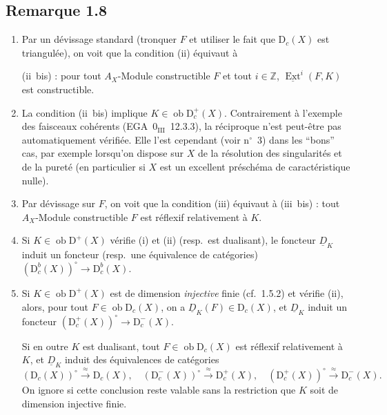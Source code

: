\documentclass[11pt]{article}
\DeclareMathOperator{\Ext}{Ext}
\newcommand{\D}{\mathrm{D}}
\newcommand{\Z}{\mathbb{Z}}
\newcommand{\ob}{\operatorname{ob}}
\begin{document}
\subsection*{Remarque 1.8}
\begin{enumerate}[label=\alph*)]
\item Par un dévissage standard (tronquer $F$ et utiliser le fait que $\D_c(X)$ est triangulée), on voit que la condition (ii) équivaut à

(ii~bis) : pour tout $A_X$-Module constructible $F$ et tout $i \in \Z$, $\underline{\Ext}^i(F,K)$ est constructible.

\item La condition (ii~bis) implique $K \in \ob \D_c^{+}(X)$. Contrairement à l'exemple des faisceaux cohérents (EGA~$0_{\mathrm{III}}$~12.3.3), la réciproque n'est peut-être pas automatiquement vérifiée. Elle l'est cependant (voir n${}^{\circ}$~3) dans les ``bons'' cas, par exemple lorsqu'on dispose sur $X$ de la résolution des singularités et de la pureté (en particulier si $X$ est un excellent préschéma de caractéristique nulle).

\item Par dévissage sur $F$, on voit que la condition (iii) équivaut à (iii~bis) : tout $A_X$-Module constructible $F$ est réflexif relativement à $K$.

\item Si $K \in \ob \D^{+}(X)$ vérifie (i) et (ii) (resp.~est dualisant), le foncteur $\underline{D}_K$ induit un foncteur (resp.~une équivalence de catégories) $(\D_c^{b}(X))^{\circ} \to \D_c^{b}(X)$.

\item Si $K \in \ob \D^{+}(X)$ est de dimension \emph{injective} finie (cf.~1.5.2) et vérifie (ii), alors, pour tout $F \in \ob \D_c(X)$, on a $\underline{D}_K(F) \in \D_c(X)$, et $\underline{D}_K$ induit un foncteur $(\D_c^{+}(X))^{\circ} \to \D_c^{-}(X)$.

Si en outre $K$ est dualisant, tout $F \in \ob \D_c(X)$ est réflexif relativement à $K$, et $\underline{D}_K$ induit des équivalences de catégories
\[
(\D_c(X))^{\circ} \xrightarrow{\approx} \D_c(X), \quad (\D_c^{-}(X))^{\circ} \xrightarrow{\approx} \D_c^{+}(X), \quad (\D_c^{+}(X))^{\circ} \xrightarrow{\approx} \D_c^{-}(X).
\]
On ignore si cette conclusion reste valable sans la restriction que $K$ soit de dimension injective finie.
\end{enumerate}
\end{document}
